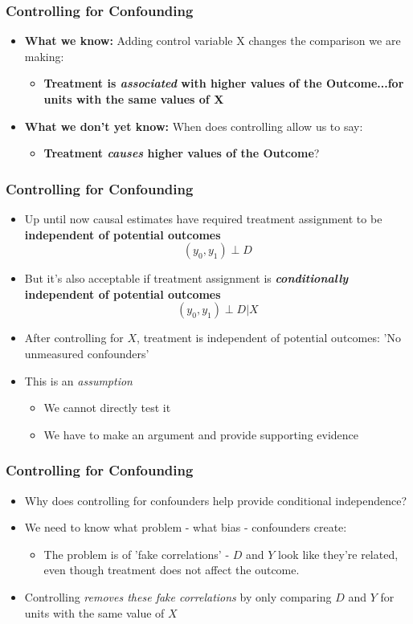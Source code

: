 \documentclass[xcolor=x11names,compress]{beamer}\usepackage[]{graphicx}\usepackage[]{color}
\renewcommand{\(}{\begin{columns}}
\renewcommand{\)}{\end{columns}}
\newcommand{\<}[1]{\begin{column}{#1}}
\renewcommand{\>}{\end{column}}
\begin{document}
\begin{frame}
\frametitle{Controlling for Confounding}
\begin{itemize}

\item \textbf{What we know:} Adding control variable X changes the comparison we are making: 
\begin{itemize} 
\item \textbf{Treatment is \textit{associated} with higher values of the Outcome...for units with the same values of X}
\end{itemize}
\pause

\item \textbf{What we don't yet know:} When does controlling allow us to say: 
\begin{itemize}
\item \textbf{Treatment \textit{causes} higher values of the Outcome}?
\end{itemize}
\end{itemize}
\end{frame}

\begin{frame}
\frametitle{Controlling for Confounding}
\begin{itemize}
\item Up until now causal estimates have required treatment assignment to be \textbf{independent of potential outcomes}
\pause
$$(y_0,y_1) \perp D$$
\pause
\item But it's also acceptable if treatment assignment is \textbf{\textit{conditionally} independent of potential outcomes}
\pause
$$(y_0,y_1) \perp D | X$$
\pause
\item After controlling for $X$, treatment is independent of potential outcomes: 'No unmeasured confounders'
\pause
\item This is an \textit{assumption} 
\pause
\begin{itemize} 
\item We cannot directly test it
\pause
\item We have to make an argument and provide supporting evidence
\end{itemize}
\end{itemize}
\end{frame}

\begin{frame}
\frametitle{Controlling for Confounding}
\begin{itemize}
\item Why does controlling for confounders help provide conditional independence?
\pause
\item We need to know what problem - what bias - confounders create:
\pause
\begin{itemize}
\item The problem is of 'fake correlations' - $D$ and $Y$ look like they're related, even though treatment does not affect the outcome. 
\end{itemize}
\item Controlling \textit{removes these fake correlations} by only comparing $D$ and $Y$ for units with the same value of $X$
\end{itemize}
\end{frame}
\end{document}
